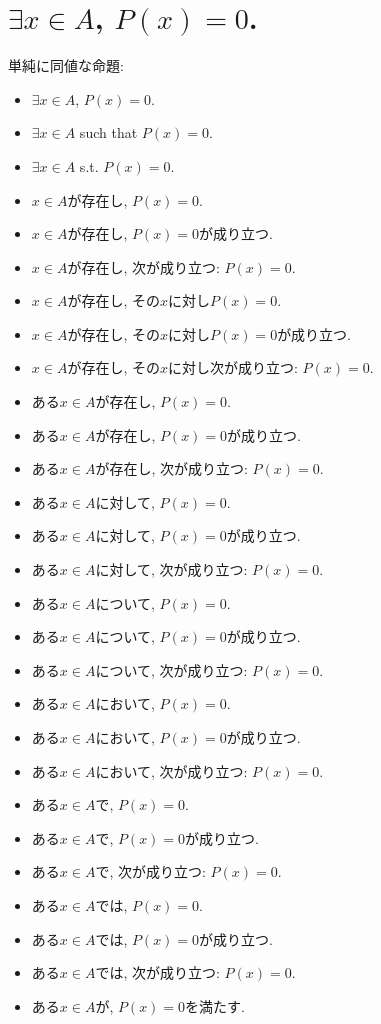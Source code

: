 \documentclass[a4paper,12pt,draft]{amsart}
\newcommand{\PPP}[1]{P(#1)=0}
\begin{document}
\section{$\exists x \in A$, $\PPP{x}$.}
単純に同値な命題:
\begin{itemize}
\item $\exists x \in A$, $\PPP{x}$.
\item $\exists x \in A$ such that $\PPP{x}$.
\item $\exists x \in A$ s.t. $\PPP{x}$.
\item $x\in A$が存在し, $\PPP{x}$.
\item $x\in A$が存在し, $\PPP{x}$が成り立つ.
\item $x\in A$が存在し, 次が成り立つ: $\PPP{x}$.
\item $x\in A$が存在し, その$x$に対し$\PPP{x}$.
\item $x\in A$が存在し, その$x$に対し$\PPP{x}$が成り立つ.
\item $x\in A$が存在し, その$x$に対し次が成り立つ: $\PPP{x}$.
\item ある$x\in A$が存在し, $\PPP{x}$.
\item ある$x\in A$が存在し, $\PPP{x}$が成り立つ.
\item ある$x\in A$が存在し, 次が成り立つ: $\PPP{x}$.
\item ある$x\in A$に対して, $\PPP{x}$.
\item ある$x\in A$に対して, $\PPP{x}$が成り立つ.
\item ある$x\in A$に対して, 次が成り立つ: $\PPP{x}$.
\item ある$x\in A$について, $\PPP{x}$.
\item ある$x\in A$について, $\PPP{x}$が成り立つ.
\item ある$x\in A$について, 次が成り立つ: $\PPP{x}$.
\item ある$x\in A$において, $\PPP{x}$.
\item ある$x\in A$において, $\PPP{x}$が成り立つ.
\item ある$x\in A$において, 次が成り立つ: $\PPP{x}$.
\item ある$x\in A$で, $\PPP{x}$.
\item ある$x\in A$で, $\PPP{x}$が成り立つ.
\item ある$x\in A$で, 次が成り立つ: $\PPP{x}$.
\item ある$x\in A$では, $\PPP{x}$.
\item ある$x\in A$では, $\PPP{x}$が成り立つ.
\item ある$x\in A$では, 次が成り立つ: $\PPP{x}$.
\item ある$x\in A$が, $\PPP{x}$を満たす.

\end{itemize}
\end{document}
